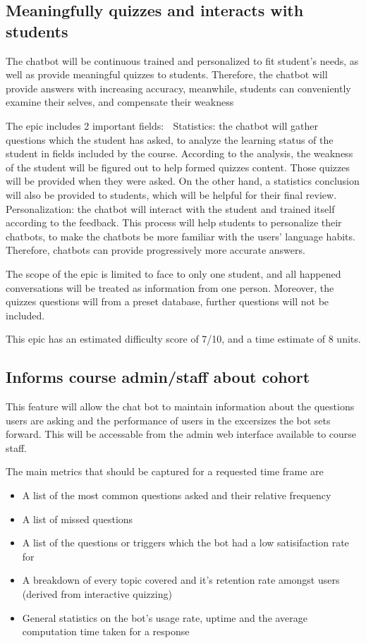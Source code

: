 \documentclass{article}
\begin{document}
\subsection{Meaningfully quizzes and interacts with students}
The chatbot will be continuous trained and personalized to fit student’s needs, as well as provide meaningful quizzes to students. Therefore, the chatbot will provide answers with increasing accuracy, meanwhile, students can conveniently examine their selves, and compensate their weakness

The epic includes 2 important fields:
	Statistics: the chatbot will gather questions which the student has asked, to analyze the learning status of the student in fields included by the course. According to the analysis, the weakness of the student will be figured out to help formed quizzes content. Those quizzes will be provided when they were asked. On the other hand, a statistics conclusion will also be provided to students, which will be helpful for their final review.
	Personalization: the chatbot will interact with the student and trained itself according to the feedback. This process will help students to personalize their chatbots, to make the chatbots be more familiar with the users’ language habits. Therefore, chatbots can provide progressively more accurate answers. 

The scope of the epic is limited to face to only one student, and all happened conversations will be treated as information from one person. Moreover, the quizzes questions will from a preset database, further questions will not be included.

This epic has an estimated difficulty score of 7/10, and a time estimate of 8 units.


\subsection{Informs course admin/staff about cohort}

This feature will allow the chat bot to maintain information about the questions users are asking and the performance of users in the excersizes the bot sets forward. This will be accessable from the admin web interface available to course staff.

The main metrics that should be captured for a requested time frame are
\begin{itemize}
  \item A list of the most common questions asked and their relative frequency
  \item A list of missed questions
  \item A list of the questions or triggers which the bot had a low satisifaction rate for
  \item A breakdown of every topic covered and it's retention rate amongst users (derived from interactive quizzing)
  \item General statistics on the bot's usage rate, uptime and the average computation time taken for a response
\end{itemize}
\end{document}
